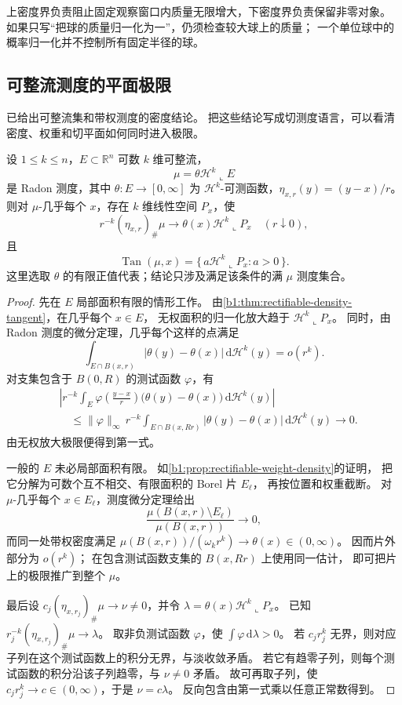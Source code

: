 上密度界负责阻止固定观察窗口内质量无限增大，下密度界负责保留非零对象。
如果只写“把球的质量归一化为一”，仍须检查较大球上的质量；
一个单位球中的概率归一化并不控制所有固定半径的球。

\subsection{可整流测度的平面极限}
\label{b1:subsec:D10103}

已给出可整流集和带权测度的密度结论。
把这些结论写成切测度语言，可以看清密度、权重和切平面如何同时进入极限。

\begin{theorem}\label{b1:thm:app-d-rectifiable-tangents}
设 \(1\leq k\leq n\)，\(E\subset\mathbb R^n\) 可数 \(k\) 维可整流，
\[
 \mu=\theta\mathcal H^k\llcorner E
\]
是 Radon 测度，其中 \(\theta:E\to[0,\infty]\) 为 \(\mathcal H^k\)-可测函数，\(\eta_{x,r}(y)=(y-x)/r\)。
则对 \(\mu\)-几乎每个 \(x\)，存在 \(k\) 维线性空间 \(P_x\)，使
\[
 r^{-k}(\eta_{x,r})_\#\mu
   \longrightarrow\theta(x)\mathcal H^k\llcorner P_x
 \quad(r\downarrow0),
\]
且
\[
 \operatorname{Tan}(\mu,x)
   =\{\,a\mathcal H^k\llcorner P_x:a>0\,\}.
\]
这里选取 \(\theta\) 的有限正值代表；结论只涉及满足该条件的满 \(\mu\) 测度集合。
\end{theorem}
\begin{proof}
先在 \(E\) 局部面积有限的情形工作。
由\cref{b1:thm:rectifiable-density-tangent}，在几乎每个 \(x\in E\)，
无权面积的归一化放大趋于 \(\mathcal H^k\llcorner P_x\)。
同时，由 Radon 测度的微分定理，几乎每个这样的点满足
\[
 \int_{E\cap B(x,r)}|\theta(y)-\theta(x)|\,\mathrm{d}\mathcal H^k(y)
     =o(r^k).
\]
对支集包含于 \(B(0,R)\) 的测试函数 \(\varphi\)，有
\[
 \begin{split}
 &\left|r^{-k}\int_E
   \varphi\!\left(\frac{y-x}{r}\right)
   \bigl(\theta(y)-\theta(x)\bigr)\,\mathrm{d}\mathcal H^k(y)\right|\\
 &\hspace{1em}\leq
  \|\varphi\|_\infty\,r^{-k}
  \int_{E\cap B(x,Rr)}|\theta(y)-\theta(x)|\,\mathrm{d}\mathcal H^k(y)
  \longrightarrow0.
 \end{split}
\]
由无权放大极限便得到第一式。

一般的 \(E\) 未必局部面积有限。
如\cref{b1:prop:rectifiable-weight-density}的证明，
把它分解为可数个互不相交、有限面积的 Borel 片 \(E_\ell\)，
再按位置和权重截断。
对 \(\mu\)-几乎每个 \(x\in E_\ell\)，测度微分定理给出
\[
 \frac{\mu(B(x,r)\setminus E_\ell)}{\mu(B(x,r))}\longrightarrow0,
\]
而同一处带权密度满足
\(\mu(B(x,r))/(\omega_kr^k)\longrightarrow\theta(x)\in(0,\infty)\)。
因而片外部分为 \(o(r^k)\)；
在包含测试函数支集的 \(B(x,Rr)\) 上使用同一估计，
即可把片上的极限推广到整个 \(\mu\)。

最后设 \(c_j(\eta_{x,r_j})_\#\mu\to\nu\neq0\)，并令
\(\lambda=\theta(x)\mathcal H^k\llcorner P_x\)。
已知 \(r_j^{-k}(\eta_{x,r_j})_\#\mu\to\lambda\)。
取非负测试函数 \(\varphi\)，使 \(\int\varphi\,\mathrm{d}\lambda>0\)。
若 \(c_jr_j^k\) 无界，则对应子列在这个测试函数上的积分无界，与淡收敛矛盾。
若它有趋零子列，则每个测试函数的积分沿该子列趋零，与 \(\nu\neq0\) 矛盾。
故可再取子列，使 \(c_jr_j^k\to c\in(0,\infty)\)，于是 \(\nu=c\lambda\)。
反向包含由第一式乘以任意正常数得到。
\end{proof}

